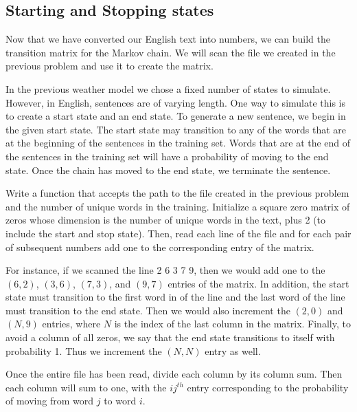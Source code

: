 \subsection*{Starting and Stopping states}

Now that we have converted our English text into numbers, we can build the transition matrix for the Markov chain.
We will scan the file we created in the previous problem and use it to create the matrix.

In the previous weather model we chose a fixed number of states to simulate.
However, in English, sentences are of varying length.
One way to simulate this is to create a start state and an end state.
To generate a new sentence, we begin in the given start state.
The start state may transition to any of the words that are at the beginning of the sentences in the training set.
Words that are at the end of the sentences in the training set will have a probability of moving to the end state.
Once the chain has moved to the end state, we terminate the sentence.

\begin{problem}
Write a function that accepts the path to the file created in the previous problem and the number of unique words in the training.
Initialize a square zero matrix of zeros whose dimension is the number of unique words in the text, plus 2 (to include the start and stop state).
Then, read each line of the file and for each pair of subsequent numbers add one to the corresponding entry of the matrix.

For instance, if we scanned the line 2 6 3 7 9, then we would add one to the $(6,2)$, $(3,6)$, $(7,3)$, and $(9,7)$ entries of the matrix.
In addition, the start state must transition to the first word in of the line and the last word of the line must transition to the end state.
Then we would also increment the $(2,0)$ and $(N,9)$ entries, where $N$ is the index of the last column in the matrix.
Finally, to avoid a column of all zeros, we say that the end state transitions to itself with probability 1.
Thus we increment the $(N,N)$ entry as well.

Once the entire file has been read, divide each column by its column sum.
Then each column will sum to one, with the $ij^{th}$ entry corresponding to the probability of moving from word $j$ to word $i$.
\label{problem:chainmaker}
\end{problem}


